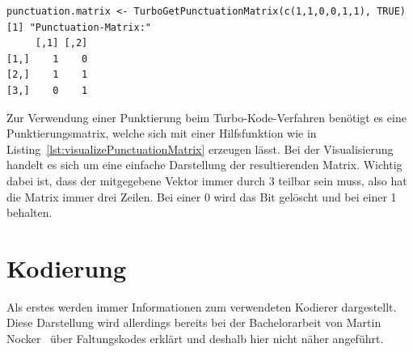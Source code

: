 \begin{lstlisting}[caption=Visualisierung der Punktierungssmatrix, label={lst:visualizePunctuationMatrix}, float=th]
punctuation.matrix <- TurboGetPunctuationMatrix(c(1,1,0,0,1,1), TRUE)
[1] "Punctuation-Matrix:"
     [,1] [,2]
[1,]    1    0
[2,]    1    1
[3,]    0    1
\end{lstlisting}

Zur Verwendung einer Punktierung beim Turbo-Kode-Verfahren benötigt es eine Punktierungsmatrix, welche sich mit einer Hilfsfunktion wie in Listing~\ref{lst:visualizePunctuationMatrix} erzeugen lässt. Bei der Visualisierung handelt es sich um eine einfache Darstellung der resultierenden Matrix. Wichtig dabei ist, dass der mitgegebene Vektor immer durch 3 teilbar sein muss, also hat die Matrix immer drei Zeilen. Bei einer 0 wird das Bit gelöscht und bei einer 1 behalten.

\FloatBarrier
\section{Kodierung}
\label{sec:visualization_encode}
Als erstes werden immer Informationen zum verwendeten Kodierer dargestellt. Diese Darstellung wird allerdings bereits bei der Bachelorarbeit von Martin Nocker~\cite[45]{nocker} über Faltungskodes erklärt und deshalb hier nicht näher angeführt.

